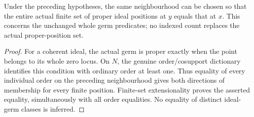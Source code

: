 \begin{theorem}
\label{hir:sharp-actual-family-proper-profile-on-product-stratum}
Under the preceding hypotheses, the same neighbourhood can be chosen
so that the entire actual finite set of proper ideal positions at $y$
equals that at $x$. This concerns the unchanged whole germ predicates;
no indexed count replaces the actual proper-position set.
\leanok
\end{theorem}
\begin{proof}
For a coherent ideal, the actual germ is proper exactly when the point
belongs to its whole zero locus. On $N$, the genuine order/cosupport
dictionary identifies this condition with ordinary order at least one.
Thus equality of every individual order on the preceding neighbourhood
gives both directions of membership for every finite position. Finite-set
extensionality proves the asserted equality, simultaneously with all
order equalities. No equality of distinct ideal-germ classes is inferred.
\end{proof}

